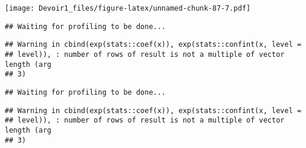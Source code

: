 \documentclass[]{article}
\newenvironment{Shaded}{\begin{snugshade}}{\end{snugshade}}
\newcommand{\KeywordTok}[1]{\textcolor[rgb]{0.13,0.29,0.53}{\textbf{#1}}}
\newcommand{\DataTypeTok}[1]{\textcolor[rgb]{0.13,0.29,0.53}{#1}}
\newcommand{\DecValTok}[1]{\textcolor[rgb]{0.00,0.00,0.81}{#1}}
\newcommand{\StringTok}[1]{\textcolor[rgb]{0.31,0.60,0.02}{#1}}
\newcommand{\OperatorTok}[1]{\textcolor[rgb]{0.81,0.36,0.00}{\textbf{#1}}}
\newcommand{\NormalTok}[1]{#1}
\begin{document}
\texttt{[image: Devoir1\_files/figure-latex/unnamed-chunk-87-7.pdf]}

\begin{Shaded}
\end{Shaded}

\begin{verbatim}
## Waiting for profiling to be done...
\end{verbatim}

\begin{verbatim}
## Warning in cbind(exp(stats::coef(x)), exp(stats::confint(x, level =
## level)), : number of rows of result is not a multiple of vector length (arg
## 3)
\end{verbatim}

\begin{verbatim}
## Waiting for profiling to be done...
\end{verbatim}

\begin{verbatim}
## Warning in cbind(exp(stats::coef(x)), exp(stats::confint(x, level =
## level)), : number of rows of result is not a multiple of vector length (arg
## 3)
\end{verbatim}
\end{document}
